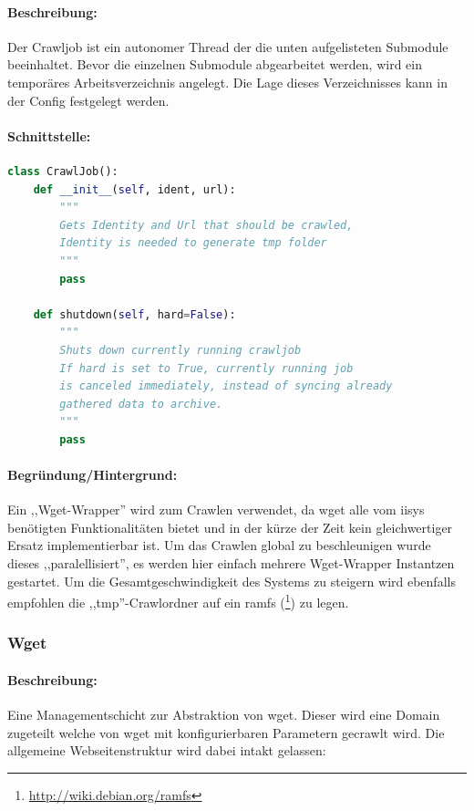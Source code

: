 
\paragraph{Beschreibung:}
\label{par:beschreibung_}
Der Crawljob ist ein autonomer Thread der die unten aufgelisteten Submodule beeinhaltet.
Bevor die einzelnen Submodule abgearbeitet werden, wird ein temporäres Arbeitsverzeichnis angelegt.
Die Lage dieses Verzeichnisses kann in der Config festgelegt werden.
\paragraph{Schnittstelle:}
\label{par:api_}

\begin{lstlisting}[language=python]
class CrawlJob():
    def __init__(self, ident, url):
        """
        Gets Identity and Url that should be crawled,
        Identity is needed to generate tmp folder
        """
        pass

    def shutdown(self, hard=False): 
        """
        Shuts down currently running crawljob
        If hard is set to True, currently running job
        is canceled immediately, instead of syncing already
        gathered data to archive.
        """
        pass
\end{lstlisting}
\paragraph{Begründung/Hintergrund:}
\label{par:begr_ndung_hintergrund_}
Ein ,,Wget-Wrapper'' wird zum Crawlen verwendet, da wget alle vom iisys benötigten Funktionalitäten bietet und
in der kürze der Zeit kein gleichwertiger Ersatz implementierbar ist. Um das Crawlen global zu 
beschleunigen wurde dieses ,,paralellisiert'', es werden hier einfach mehrere Wget-Wrapper Instantzen gestartet.
Um die Gesamtgeschwindigkeit des Systems zu steigern wird ebenfalls empfohlen die ,,tmp''-Crawlordner auf ein
ramfs (\footnote{\url{http://wiki.debian.org/ramfs}}) zu legen.

\subsubsection{Wget}
\label{ssub:wget}
\paragraph{Beschreibung:}
\label{par:beschreibung_}
Eine Managementschicht zur Abstraktion von wget.
Dieser wird eine Domain zugeteilt welche von wget mit konfigurierbaren Parametern gecrawlt wird.
Die allgemeine Webseitenstruktur wird dabei intakt gelassen:

